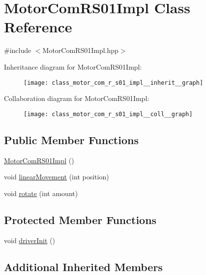 \hypertarget{class_motor_com_r_s01_impl}{}\section{Motor\+Com\+R\+S01\+Impl Class Reference}
\label{class_motor_com_r_s01_impl}


{\ttfamily \#include $<$Motor\+Com\+R\+S01\+Impl.\+hpp$>$}



Inheritance diagram for Motor\+Com\+R\+S01\+Impl\+:\nopagebreak
\begin{figure}[H]
\begin{center}
\leavevmode
\texttt{[image: class\_motor\_com\_r\_s01\_impl\_\_inherit\_\_graph]}
\end{center}
\end{figure}


Collaboration diagram for Motor\+Com\+R\+S01\+Impl\+:\nopagebreak
\begin{figure}[H]
\begin{center}
\leavevmode
\texttt{[image: class\_motor\_com\_r\_s01\_impl\_\_coll\_\_graph]}
\end{center}
\end{figure}
\subsection*{Public Member Functions}
\begin{DoxyCompactItemize}
\item 
\hyperlink{class_motor_com_r_s01_impl_a1f30f6ac77e75f0d69ea83db894a5ccf}{Motor\+Com\+R\+S01\+Impl} ()
\item 
void \hyperlink{class_motor_com_r_s01_impl_a329b9e6783f49d16ad6a57a34b1d29a3}{linear\+Movement} (int position)
\item 
void \hyperlink{class_motor_com_r_s01_impl_aacd356794c8c05da436e52293b41476d}{rotate} (int amount)
\end{DoxyCompactItemize}
\subsection*{Protected Member Functions}
\begin{DoxyCompactItemize}
\item 
void \hyperlink{class_motor_com_r_s01_impl_a958cf9b3e05aba957af3e6df80e4ec2f}{driver\+Init} ()
\end{DoxyCompactItemize}
\subsection*{Additional Inherited Members}



